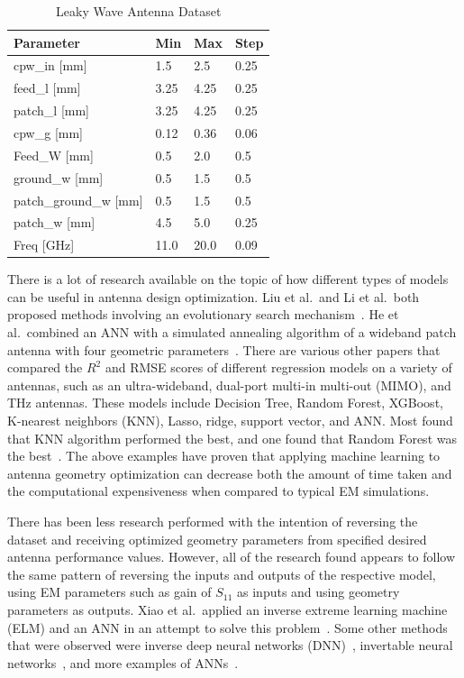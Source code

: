 \documentclass[conference]{IEEEtran}
\begin{document}
\begin{table}[h]
\caption{Leaky Wave Antenna Dataset}
\begin{center}
\begin{tabular}{ |l|l|l|l| }
    \hline
    Parameter & Min & Max & Step \\ 
    \hline
    cpw\_in [mm] & 1.5 & 2.5 & 0.25 \\
    \hline
    feed\_l [mm] & 3.25 & 4.25 & 0.25 \\
    \hline
    patch\_l [mm] & 3.25 & 4.25 & 0.25 \\
    \hline
    cpw\_g [mm] & 0.12 & 0.36 & 0.06 \\
    \hline
    Feed\_W [mm] & 0.5 & 2.0 & 0.5 \\
    \hline
    ground\_w [mm] & 0.5 & 1.5 & 0.5 \\
    \hline
    patch\_ground\_w [mm] & 0.5 & 1.5 & 0.5 \\
    \hline
    patch\_w [mm] & 4.5 & 5.0 & 0.25 \\
    \hline
    Freq [GHz] & 11.0 & 20.0 & 0.09 \\
    \hline
\end{tabular}
\end{center}
\label{antenna_dataset}
\end{table}

There is a lot of research available on the topic of how different types of models can be useful in antenna design optimization. Liu et al.~and Li et al.~both proposed methods involving an evolutionary search mechanism~\cite{liu_efficient_2014,li_adaptive_2023}. He et al.~combined an ANN with a simulated annealing algorithm of a wideband patch antenna with four geometric parameters~\cite{10318051}. There are various other papers that compared the $R^2$ and RMSE scores of different regression models on a variety of antennas, such as an ultra-wideband, dual-port multi-in multi-out (MIMO), and THz antennas. These models include Decision Tree, Random Forest, XGBoost, K-nearest neighbors (KNN), Lasso, ridge, support vector, and ANN. Most found that KNN algorithm performed the best, and one found that Random Forest was the best~\cite{9119820,ranjan_ultra-wideband_2022,ranjan_design_2023,sharma_machine_2020,jain_estimation_2022,jain_design_2024}. The above examples have proven that applying machine learning to antenna geometry optimization can decrease both the amount of time taken and the computational expensiveness when compared to typical EM simulations.

There has been less research performed with the intention of reversing the dataset and receiving optimized geometry parameters from specified desired antenna performance values. However, all of the research found appears to follow the same pattern of reversing the inputs and outputs of the respective model, using EM parameters such as gain of $S_{11}$ as inputs and using geometry parameters as outputs. Xiao et al.~applied an inverse extreme learning machine (ELM) and an ANN in an attempt to solve this problem~\cite{9063448,XiaoLi-Ye2021IANN}. Some other methods that were observed were inverse deep neural networks (DNN)~\cite{wu_ai_2024,zhang_inverse_2023}, invertable neural networks~\cite{yu_design_2020}, and more examples of ANNs~\cite{yuan_multibranch_2020}.
\end{document}
